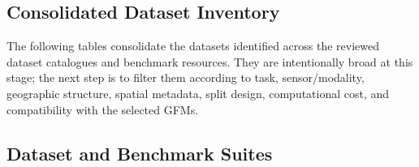 \usepackage{longtable}
\usepackage{pdflscape}
\usepackage{array}
\usepackage{ragged2e}

\subsection{Consolidated Dataset Inventory}

The following tables consolidate the datasets identified across the reviewed
dataset catalogues and benchmark resources. They are intentionally broad at
this stage; the next step is to filter them according to task, sensor/modality,
geographic structure, spatial metadata, split design, computational cost, and
compatibility with the selected GFMs.



\subsection{Dataset and Benchmark Suites}


